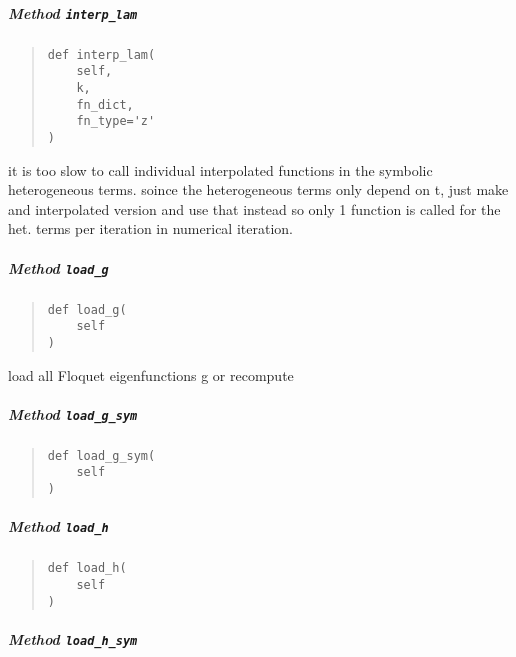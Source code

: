 \documentclass[
  english,
  a4paper,
  oneside]{article}
\begin{document}
\hypertarget{StrongCoupling.StrongCoupling.interp_lam}{%
\subparagraph{\texorpdfstring{Method
\texttt{interp\_lam}}{Method interp\_lam}}\label{StrongCoupling.StrongCoupling.interp_lam}}

\begin{quote}
\begin{verbatim}
def interp_lam(
    self,
    k,
    fn_dict,
    fn_type='z'
)
\end{verbatim}
\end{quote}

it is too slow to call individual interpolated functions in the symbolic
heterogeneous terms. soince the heterogeneous terms only depend on t,
just make and interpolated version and use that instead so only 1
function is called for the het. terms per iteration in numerical
iteration.

\hypertarget{StrongCoupling.StrongCoupling.load_g}{%
\subparagraph{\texorpdfstring{Method
\texttt{load\_g}}{Method load\_g}}\label{StrongCoupling.StrongCoupling.load_g}}

\begin{quote}
\begin{verbatim}
def load_g(
    self
)
\end{verbatim}
\end{quote}

load all Floquet eigenfunctions g or recompute

\hypertarget{StrongCoupling.StrongCoupling.load_g_sym}{%
\subparagraph{\texorpdfstring{Method
\texttt{load\_g\_sym}}{Method load\_g\_sym}}\label{StrongCoupling.StrongCoupling.load_g_sym}}

\begin{quote}
\begin{verbatim}
def load_g_sym(
    self
)
\end{verbatim}
\end{quote}

\hypertarget{StrongCoupling.StrongCoupling.load_h}{%
\subparagraph{\texorpdfstring{Method
\texttt{load\_h}}{Method load\_h}}\label{StrongCoupling.StrongCoupling.load_h}}

\begin{quote}
\begin{verbatim}
def load_h(
    self
)
\end{verbatim}
\end{quote}

\hypertarget{StrongCoupling.StrongCoupling.load_h_sym}{%
\subparagraph{\texorpdfstring{Method
\texttt{load\_h\_sym}}{Method load\_h\_sym}}\label{StrongCoupling.StrongCoupling.load_h_sym}}
\end{document}
